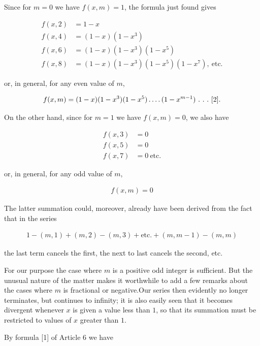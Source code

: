 \clearpage{}

Since for $m=0$ we have $f(x,m)=1$, the formula just found gives

\[
\begin{aligned}
f(x,2)&=1-x\\
f(x,4)&=(1-x)(1-x^3)\\
f(x,6)&=(1-x)(1-x^3)(1-x^5)\\
f(x,8)&=(1-x)(1-x^3)(1-x^5)(1-x^7),\ \text{etc.}
\end{aligned}
\]

or, in general, for any even value of $m$,

\[
\begin{aligned}
f(x,m)=(1-x)(1-x^3)(1-x^5)\mathinner{.\,.\,.\,.}(1-x^{m-1})\ .\ .\ .\ [2].
\end{aligned}
\]

On the other hand, since for $m=1$ we have $f(x,m)=0$, we also have

\[
\begin{aligned}
f(x,3)&=0\\
f(x,5)&=0\\
f(x,7)&=0\ \text{etc.}
\end{aligned}
\]

or, in general, for any odd value of $m$,

\[
\begin{aligned}
f(x,m)=0
\end{aligned}
\]

The latter summation could, moreover, already have been derived from the fact that in the series

\[
\begin{aligned}
1-(m,1)+(m,2)-(m,3)+\text{etc.}+(m,m-1)-(m,m)
\end{aligned}
\]

the last term cancels the first, the next to last cancels the second, etc.


For our purpose the case where $m$ is a positive odd integer is sufficient. But the unusual nature of the matter makes it worthwhile to add a few remarks about the cases where $m$ is fractional or negative.\quad Our series then evidently no longer terminates, but continues to infinity; it is also easily seen that it becomes divergent whenever $x$ is given a value less than $1$, so that its summation must be restricted to values of $x$ greater than $1$.

By formula [1] of Article 6 we have

